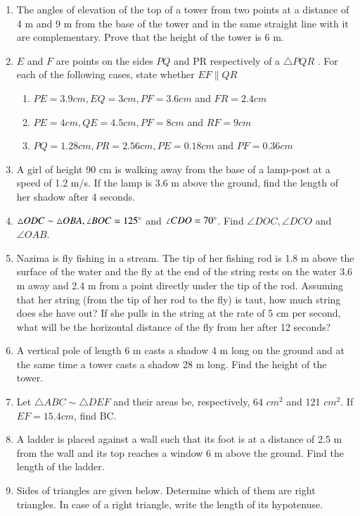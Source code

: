 \begin{enumerate}[label=\thesection.\arabic*.,ref=\thesection.\theenumi]
\item The angles of elevation of the top of a tower from two points at a distance of 4 m and 9 m from the base of the tower and in the same straight line with it are complementary. Prove that the height of the tower is 6 m.
%
\item $E$ and $F$ are points on the sides  $PQ$  and PR respectively of a  $\triangle PQR$ . For each of the following cases, state whether $EF  \parallel  QR$ 
\begin{enumerate}
\item  $PE = 3.9 cm, EQ = 3 cm, PF = 3.6 cm$ and $FR = 2.4 cm $
\item  $PE = 4 cm, QE = 4.5 cm, PF = 8 cm$ and $RF = 9 cm $
\item   $PQ  = 1.28 cm, PR = 2.56 cm, PE = 0.18 cm$ and $PF = 0.36 cm$
\end{enumerate}
\item A girl of height 90 cm is walking away from the base of a lamp-post at a speed of 1.2 m/s. If the lamp is 3.6 m above the ground, find the length of her shadow after 4 seconds.
\item  $ \triangle  ODC \sim  \triangle  OBA, \angle BOC = 125 \degree$ and $\angle CDO = 70 \degree$. Find $\angle DOC, \angle DCO$ and $\angle OAB$.
\item  Nazima is fly fishing in a stream. The tip of her fishing rod is 1.8 m above the surface of the water and the fly at the end of the string rests on the water 3.6 m away and 2.4 m from a point directly under the tip of the rod. Assuming that her string (from the tip of her rod to the fly) is taut, how much string does she have out? If she pulls in the string at the rate of 5 cm per second, what will be the horizontal distance of the fly from her after 12 seconds?
%
\item  A vertical pole of length 6 m casts a shadow 4 m long on the ground and at the same time a tower casts a shadow 28 m long. Find the height of the tower.
\item Let  $\triangle  ABC  \sim   \triangle  DEF$ and their areas be, respectively, 64 $cm^2$ and 121 $cm^2$.  If $EF = 15.4 cm$, find BC.
\item A ladder is placed against a wall such that its foot is at a distance of 2.5 m from the wall and its top reaches a window 6 m above the ground. Find the length of the ladder.
\item Sides of triangles are given below. Determine which of them are right triangles. In case of a right triangle, write the length of its hypotenuse. 

\end{enumerate}
